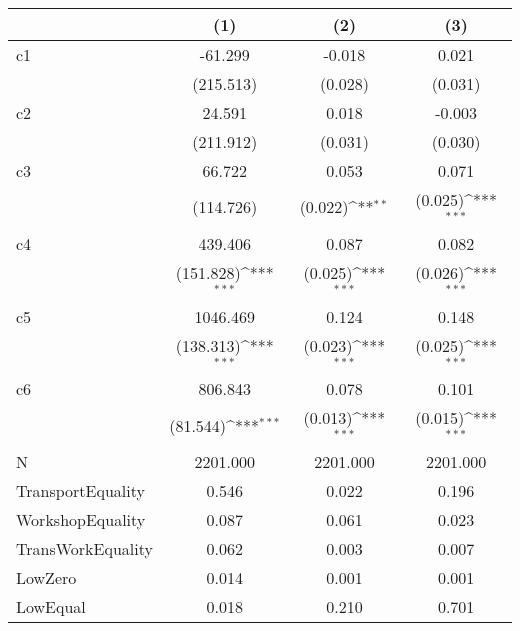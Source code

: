{
\def\sym#1{\ifmmode^{#1}\else\(^{#1}\)\fi}
\begin{tabular*}{7in}{@{\hskip\tabcolsep\extracolsep\fill}l*{3}{c}}
\hline\hline
                &\multicolumn{1}{c}{(1)}         &\multicolumn{1}{c}{(2)}         &\multicolumn{1}{c}{(3)}         \\
\hline
c1              &  -61.299         &   -0.018         &    0.021         \\
                &(215.513)         &  (0.028)         &  (0.031)         \\
[1em]
c2              &   24.591         &    0.018         &   -0.003         \\
                &(211.912)         &  (0.031)         &  (0.030)         \\
[1em]
c3              &   66.722         &    0.053         &    0.071         \\
                &(114.726)         &  (0.022)\sym{**} &  (0.025)\sym{***}\\
[1em]
c4              &  439.406         &    0.087         &    0.082         \\
                &(151.828)\sym{***}&  (0.025)\sym{***}&  (0.026)\sym{***}\\
[1em]
c5              & 1046.469         &    0.124         &    0.148         \\
                &(138.313)\sym{***}&  (0.023)\sym{***}&  (0.025)\sym{***}\\
[1em]
c6              &  806.843         &    0.078         &    0.101         \\
                & (81.544)\sym{***}&  (0.013)\sym{***}&  (0.015)\sym{***}\\
\hline
N               & 2201.000         & 2201.000         & 2201.000         \\
TransportEquality&    0.546         &    0.022         &    0.196         \\
WorkshopEquality&    0.087         &    0.061         &    0.023         \\
TransWorkEquality&    0.062         &    0.003         &    0.007         \\
LowZero         &    0.014         &    0.001         &    0.001         \\
LowEqual        &    0.018         &    0.210         &    0.701         \\
\hline\hline
\end{tabular*}
}
